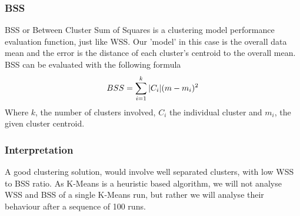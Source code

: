 \documentclass[12pt]{article}
\begin{document}
	 			\subsubsection*{BSS}
		 			BSS or  Between Cluster Sum of Squares is a clustering model performance evaluation function, just like WSS. Our 'model' in this case is the overall data mean and the error is the distance of each cluster's centroid to the overall mean. BSS can be evaluated with the following formula\cite{???}
		 			\begin{align}
		 				BSS = \sum_{i=1}^{k}{\abs{C_i}(m-m_i)^2}
		 			\end{align}
		 			Where $k$, the number of clusters involved, $C_i$ the individual cluster and $m_i$, the given cluster centroid.
		 		\subsubsection*{Interpretation}
		 			A good clustering solution, would involve well separated clusters, with low WSS to BSS ratio\cite{???}. As K-Means is a heuristic based algorithm, we will not analyse WSS and BSS of a single K-Means run, but rather we will analyse their behaviour after a sequence of 100 runs. 
\end{document}
